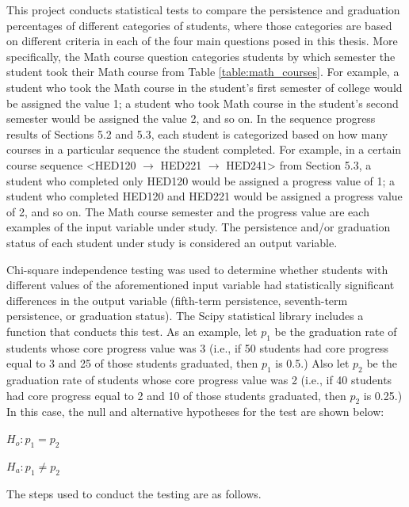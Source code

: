 This project conducts statistical tests to compare the persistence and graduation percentages of different categories of students, where those categories are based on different criteria in each of the four main questions posed in this thesis.  More specifically, the Math course question categories students by which semester the student took their Math course from Table \ref{table:math_courses}.  For example, a student who took the Math course in the student's first semester of college would be assigned the value 1; a student who took Math course in the student's second semester would be assigned the value 2, and so on.  In the sequence progress results of Sections 5.2 and 5.3, each student is categorized based on how many courses in a particular sequence the student completed.  For example, in a certain course sequence \textless HED120 $\rightarrow$ HED221 $\rightarrow$ HED241\textgreater{} from Section 5.3, a student who completed only HED120 would be assigned a progress value of 1; a student who completed HED120 and HED221 would be assigned a progress value of 2, and so on.  The Math course semester and the progress value are each examples of the input variable under study.  The persistence and/or graduation status of each student under study is considered an output variable.

Chi-square independence testing was used to determine whether students with different values of the aforementioned input variable had statistically significant differences in the output variable (fifth-term persistence, seventh-term persistence, or graduation status).  The Scipy statistical library \cite{Scipy} includes a function that conducts this test. As an example, let $p_1$ be the graduation rate of students whose core progress value was 3 (i.e., if 50 students had core progress equal to 3 and 25 of those students graduated, then $p_1$ is 0.5.)  Also let $p_2$ be the graduation rate of students whose core progress value was 2 (i.e., if 40 students had core progress equal to 2 and 10 of those students graduated, then $p_2$ is 0.25.)  In this case, the null and alternative hypotheses for the test are shown below:

$H_o: p_1 = p_2$

$H_a: p_1 \neq p_2$

The steps used to conduct the testing are as follows.

